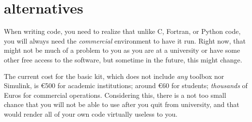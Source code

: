 %
%
%
%
%
\newpage
\section*{\matlab{} alternatives}

When writing \matlab{} code, you need to realize that unlike C, Fortran, or
Python code, you will always need the \emph{commercial} \matlab{} environment
to have it run. Right now, that might not be much of a problem to you as you
are at a university or have some other free access to the software, but
sometime in the future, this might change.

The current cost for the basic \matlab{} kit, which does not include
\emph{any} toolbox nor Simulink, is €500 for academic institutions;
around €60 for students; \emph{thousands} of Euros for commercial
operations. Considering this, there is a not too small chance that you will
not be able to use \matlab{} after you quit from university, and that would
render all of your own code virtually useless to you.

